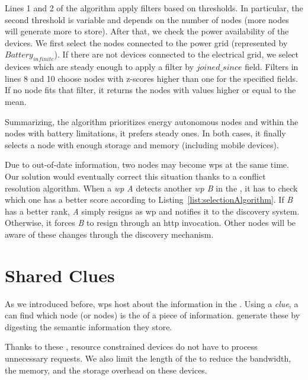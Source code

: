Lines 1 and 2 of the algorithm apply filters based on thresholds.
In particular, the second threshold is variable and depends on the number of nodes (more nodes will generate more \clues{} to store).
After that, we check the power availability of the devices.
We first select the nodes connected to the power grid (represented by $Battery_{infinite}$).
If there are not devices connected to the electrical grid, we select devices which are steady enough to apply a filter by $joined\_since$ field.
Filters in lines 8 and 10 choose nodes with z-scores higher than one for the specified fields.
If no node fits that filter, it returns the nodes with values higher or equal to the mean.

Summarizing, the algorithm prioritizes energy autonomous nodes and within the nodes with battery limitations, it prefers steady ones.
In both cases, it finally selects a node with enough storage and memory (including mobile devices).


Due to out-of-date information, two nodes may become \acp{wp} at the same time.
Our solution would eventually correct this situation thanks to a conflict resolution algorithm.
When a \emph{\acs{wp} A} detects another \emph{\acs{wp} B} in the \Space{}, it has to check which one has a better score according to Listing~\ref{list:selectionAlgorithm}.
If \emph{B} has a better rank, \emph{A} simply resigns as \ac{wp} and notifies it to the discovery system.
Otherwise, it forces \emph{B} to resign through an \acs{http} invocation.
Other nodes will be aware of these changes through the discovery mechanism.




\section{Shared Clues}
\label{sec:clues}
As we introduced before, \acp{wp} host \clues{} about the information in the \Space{}.
Using a \emph{clue}, a \consumer{} can find which node (or nodes) is the \provider{} of a piece of information.
\providers{} generate these \clues{} by digesting the semantic information they store.

Thanks to these \clues{}, resource constrained devices do not have to process unnecessary requests.
We also limit the length of the \clues{} to reduce the bandwidth, the memory, and the storage overhead on these devices.


